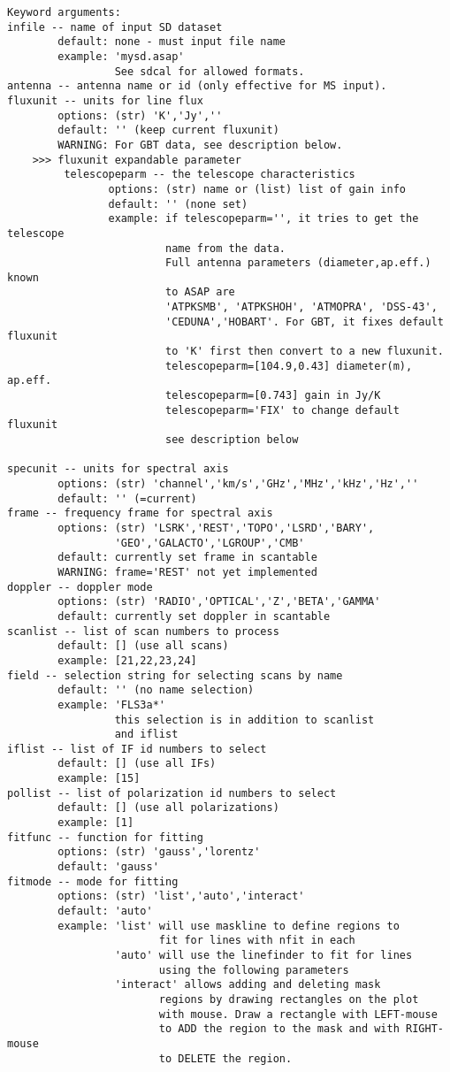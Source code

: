 \begin{verbatim}
Keyword arguments:
infile -- name of input SD dataset
        default: none - must input file name
        example: 'mysd.asap'
                 See sdcal for allowed formats.
antenna -- antenna name or id (only effective for MS input). 
fluxunit -- units for line flux
        options: (str) 'K','Jy',''
        default: '' (keep current fluxunit)
        WARNING: For GBT data, see description below.
    >>> fluxunit expandable parameter
         telescopeparm -- the telescope characteristics
                options: (str) name or (list) list of gain info
                default: '' (none set)
                example: if telescopeparm='', it tries to get the telescope
                         name from the data.
                         Full antenna parameters (diameter,ap.eff.) known
                         to ASAP are
                         'ATPKSMB', 'ATPKSHOH', 'ATMOPRA', 'DSS-43',
                         'CEDUNA','HOBART'. For GBT, it fixes default fluxunit
                         to 'K' first then convert to a new fluxunit.
                         telescopeparm=[104.9,0.43] diameter(m), ap.eff.
                         telescopeparm=[0.743] gain in Jy/K
                         telescopeparm='FIX' to change default fluxunit
                         see description below

specunit -- units for spectral axis
        options: (str) 'channel','km/s','GHz','MHz','kHz','Hz',''
        default: '' (=current)
frame -- frequency frame for spectral axis
        options: (str) 'LSRK','REST','TOPO','LSRD','BARY',
                 'GEO','GALACTO','LGROUP','CMB'
        default: currently set frame in scantable
        WARNING: frame='REST' not yet implemented
doppler -- doppler mode
        options: (str) 'RADIO','OPTICAL','Z','BETA','GAMMA'
        default: currently set doppler in scantable
scanlist -- list of scan numbers to process
        default: [] (use all scans)
        example: [21,22,23,24]
field -- selection string for selecting scans by name
        default: '' (no name selection)
        example: 'FLS3a*'
                 this selection is in addition to scanlist
                 and iflist
iflist -- list of IF id numbers to select
        default: [] (use all IFs)
        example: [15]
pollist -- list of polarization id numbers to select
        default: [] (use all polarizations)
        example: [1]
fitfunc -- function for fitting
        options: (str) 'gauss','lorentz'
        default: 'gauss'
fitmode -- mode for fitting
        options: (str) 'list','auto','interact'
        default: 'auto'
        example: 'list' will use maskline to define regions to
                        fit for lines with nfit in each
                 'auto' will use the linefinder to fit for lines
                        using the following parameters
                 'interact' allows adding and deleting mask 
                        regions by drawing rectangles on the plot 
                        with mouse. Draw a rectangle with LEFT-mouse 
                        to ADD the region to the mask and with RIGHT-mouse 
                        to DELETE the region. 


\end{verbatim}
